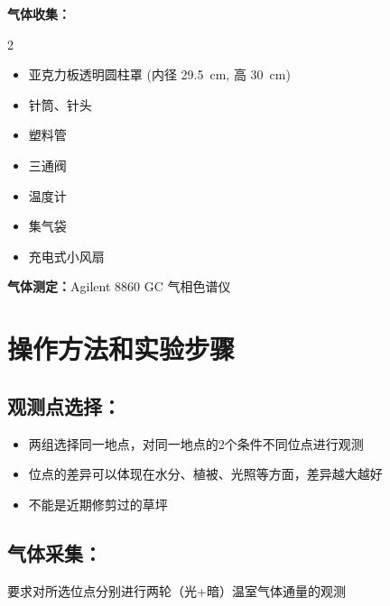 \documentclass[10.5pt]{config}
\begin{document}
\textbf{气体收集：} 

\begin{multicols}{2}
\begin{itemize}[leftmargin=*]
    \item 亚克力板透明圆柱罩 (内径 \SI{29.5}{\centi\meter}, 高 \SI{30}{\centi\meter}) 
    \item 针筒、针头 
    \item 塑料管 
    \item 三通阀 
    \item 温度计 
    \item 集气袋 
    \item 充电式小风扇 
\end{itemize}
\end{multicols}

\textbf{气体测定：}Agilent 8860 GC 气相色谱仪

\section{操作方法和实验步骤}

\subsection{观测点选择：}

\begin{itemize}
    \item 两组选择同一地点，对同一地点的2个条件不同位点进行观测
    \item 位点的差异可以体现在水分、植被、光照等方面，差异越大越好
    \item 不能是近期修剪过的草坪
\end{itemize}

\subsection{气体采集：}

要求对所选位点分别进行两轮（光+暗）温室气体通量的观测
\end{document}
